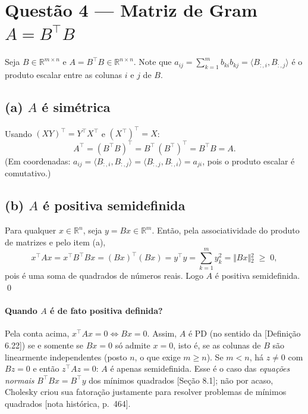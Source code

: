 \documentclass{article}
\newcommand{\R}{\mathbb{R}}
\newcommand{\T}{^{\top}}
\newcommand{\burden}[1]{\textsf{\footnotesize[#1]}}
\theoremstyle{remark}
\begin{document}
\section{Questão 4 --- Matriz de Gram $A=B\T B$}
Seja $B\in\R^{m\times n}$ e $A=B\T B\in\R^{n\times n}$. Note que $a_{ij}=\sum_{k=1}^m b_{ki}b_{kj}=\langle B_{:,i},B_{:,j}\rangle$
é o produto escalar entre as colunas $i$ e $j$ de $B$.

\subsection*{(a) $A$ é simétrica}
Usando $(XY)\T=Y\T X\T$ e $(X\T)\T=X$:
\[A\T=(B\T B)\T=B\T\,(B\T)\T=B\T B=A .\]
(Em coordenadas: $a_{ij}=\langle B_{:,i},B_{:,j}\rangle=\langle B_{:,j},B_{:,i}\rangle=a_{ji}$, pois o produto escalar é comutativo.)

\subsection*{(b) $A$ é positiva semidefinida}
Para qualquer $x\in\R^n$, seja $y=Bx\in\R^m$. Então, pela associatividade do produto de matrizes e pelo item (a),
\[x\T Ax=x\T B\T Bx=(Bx)\T(Bx)=y\T y=\sum_{k=1}^m y_k^2=\Vert{}Bx\Vert{}_2^2\;\ge\;0 ,\]
pois é uma soma de quadrados de números reais. Logo $A$ é positiva semidefinida. \qed

\paragraph{Quando $A$ é de fato positiva definida?} Pela conta acima, $x\T Ax=0\iff Bx=0$. Assim, $A$ é PD (no sentido da
\burden{Definição 6.22}) se e somente se $Bx=0$ só admite $x=0$, isto é, se as colunas de $B$ são linearmente
independentes (posto $n$, o que exige $m\ge n$). Se $m<n$, há $z\ne0$ com $Bz=0$ e então $z\T Az=0$: $A$ é apenas
semidefinida. Esse é o caso das \emph{equações normais} $B\T Bx=B\T y$ dos mínimos quadrados \burden{Seção 8.1}; não por acaso,
Cholesky criou sua fatoração justamente para resolver problemas de mínimos quadrados \burden{nota histórica, p.~464}.
\end{document}
